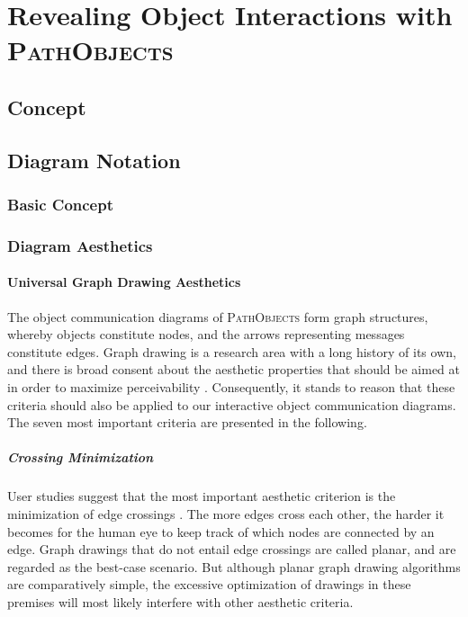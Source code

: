 \chapter{Revealing Object Interactions with \textsc{PathObjects}}
\label{c:approach}

\section{Concept}

\section{Diagram Notation}

\subsection{Basic Concept}

\subsection{Diagram Aesthetics}
\subsubsection{Universal Graph Drawing Aesthetics}
The object communication diagrams of \textsc{PathObjects} form graph structures, whereby  objects constitute nodes, and the arrows representing messages constitute edges.
Graph drawing is a research area with a long history of its own, and there is broad consent about the aesthetic properties that should be aimed at in order to maximize perceivability \cite{battista_graph_1998, kaufmann_drawing_2001, diehl_software_2007}.
Consequently, it stands to reason that these criteria should also be applied to our interactive object communication diagrams.
The seven most important criteria are presented in the following.

\paragraph{Crossing Minimization} User studies suggest that the most important aesthetic criterion is the minimization of edge crossings \cite{purchase_effective_2000, purchase_graph_2004, purchase_graph_2010}.
The more edges cross each other, the harder it becomes for the human eye to keep track of which nodes are connected by an edge.
Graph drawings that do not entail edge crossings are called planar, and are regarded as the best-case scenario.
But although planar graph drawing algorithms are comparatively simple, the excessive optimization of drawings in these premises will most likely interfere with other aesthetic criteria.

